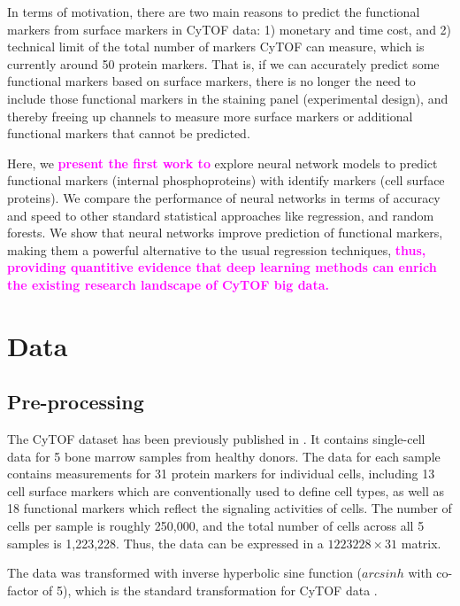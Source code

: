 \documentclass[graybox]{svmult}
\newcommand{\claudia}[2]{\sout{#1}\textcolor{magenta}{\textbf{#2}}}
\begin{document}
In terms of motivation, there are two main reasons to predict the
functional markers from surface markers in CyTOF data: 1) monetary and
time cost, and 2) technical limit of the total number of markers CyTOF
can measure, which is currently around 50 protein markers. That is, if
we can accurately predict some functional markers based on surface
markers, there is no longer the need to include those functional
markers in the staining panel (experimental design), and thereby
freeing up channels to measure more surface markers or additional
functional markers that cannot be predicted.


Here, we \claudia{}{present the first work to} explore neural network
models to predict functional markers (internal phosphoproteins) with
identify markers (cell surface proteins). We compare the performance
of neural networks in terms of accuracy and speed to other standard
statistical approaches like regression, and random forests.  We show
that neural networks improve prediction of functional markers, making
them a powerful alternative to the usual regression techniques,
\claudia{}{thus, providing quantitive evidence that deep learning
  methods can enrich the existing research landscape of CyTOF big
  data.}



\section{Data}

\subsection{Pre-processing}

The CyTOF dataset has been previously published in
\cite{Bendall2011,Qiu2011}. It contains single-cell data for 5 bone marrow samples from healthy donors. The data for each sample contains measurements for 31 protein markers for individual cells, including 13 cell surface markers which are conventionally used to define cell types, as well as 18 functional markers which reflect the signaling activities of cells. The number of cells per sample is roughly 250,000, and the total number of cells across all 5 samples is 1,223,228. Thus, the data can be expressed in a $1223228 \times 31$
matrix.

The data was transformed with inverse hyperbolic sine function
($arcsinh$ with co-factor of 5), which is the standard transformation
for CyTOF data \cite{Bendall2011}.
\end{document}
